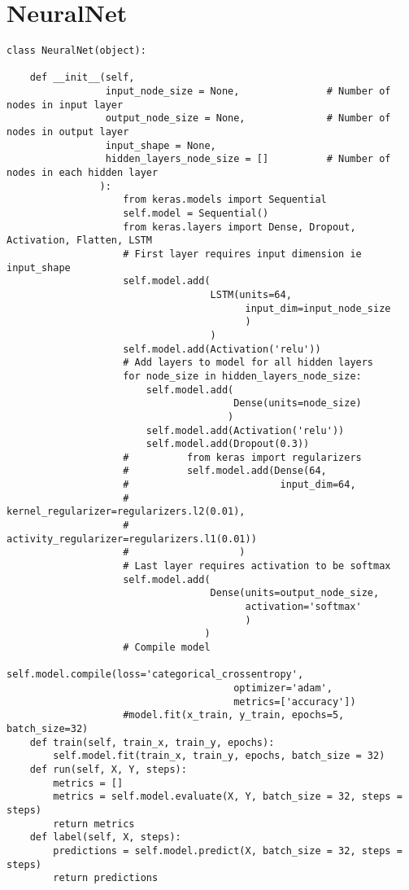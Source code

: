 \documentclass[11pt]{article}
\begin{document}
\section{NeuralNet}
\label{sec:org8ff7963}
\begin{verbatim}
class NeuralNet(object):

    def __init__(self,
                 input_node_size = None,               # Number of nodes in input layer
                 output_node_size = None,              # Number of nodes in output layer
                 input_shape = None,
                 hidden_layers_node_size = []          # Number of nodes in each hidden layer
                ):
                    from keras.models import Sequential
                    self.model = Sequential()
                    from keras.layers import Dense, Dropout, Activation, Flatten, LSTM
                    # First layer requires input dimension ie input_shape
                    self.model.add(
                                   LSTM(units=64,
                                         input_dim=input_node_size
                                         )
                                   )
                    self.model.add(Activation('relu'))
                    # Add layers to model for all hidden layers
                    for node_size in hidden_layers_node_size:
                        self.model.add(
                                       Dense(units=node_size)
                                      )
                        self.model.add(Activation('relu'))
                        self.model.add(Dropout(0.3))
                    #          from keras import regularizers
                    #          self.model.add(Dense(64,
                    #                          input_dim=64,
                    #                          kernel_regularizer=regularizers.l2(0.01),
                    #                          activity_regularizer=regularizers.l1(0.01))
                    #                   )
                    # Last layer requires activation to be softmax
                    self.model.add(
                                   Dense(units=output_node_size,
                                         activation='softmax'
                                         )
                                  )
                    # Compile model
                    self.model.compile(loss='categorical_crossentropy',
                                       optimizer='adam',
                                       metrics=['accuracy'])
                    #model.fit(x_train, y_train, epochs=5, batch_size=32)
    def train(self, train_x, train_y, epochs):
        self.model.fit(train_x, train_y, epochs, batch_size = 32)
    def run(self, X, Y, steps):
        metrics = []
        metrics = self.model.evaluate(X, Y, batch_size = 32, steps = steps)
        return metrics
    def label(self, X, steps):
        predictions = self.model.predict(X, batch_size = 32, steps = steps)
        return predictions
\end{verbatim}
\end{document}
